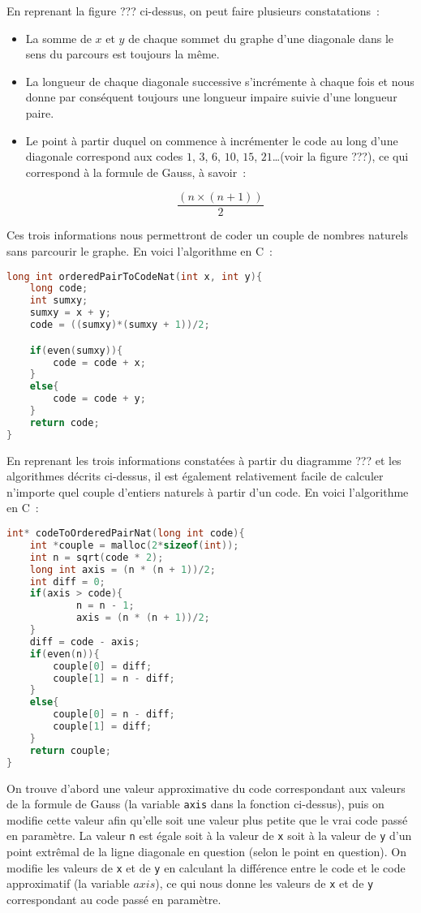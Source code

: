 \documentclass{article}
\begin{document}
En reprenant la figure ??? ci-dessus, on peut faire plusieurs constatations~:

\begin{itemize}
\item La somme de $x$ et $y$ de chaque sommet du graphe d'une diagonale dans le sens du parcours est toujours la même.
\item La longueur de chaque diagonale successive s'incrémente à chaque fois et nous donne par conséquent toujours une longueur impaire suivie d'une longueur paire.
\item Le point à partir duquel on commence à incrémenter le code au long d'une diagonale correspond aux codes $1$, $3$, $6$, $10$, $15$, $21$\ldots (voir la figure ???), ce qui correspond à la formule de Gauss, à savoir~:

$$\dfrac{(n \times (n + 1))}{2}$$
\end{itemize}

Ces trois informations nous permettront de coder un couple de nombres naturels sans parcourir le graphe. En voici l'algorithme en C~:

\begin{lstlisting}[language=C]
long int orderedPairToCodeNat(int x, int y){
	long code;
	int sumxy; 
	sumxy = x + y;
	code = ((sumxy)*(sumxy + 1))/2;

	if(even(sumxy)){
		code = code + x;
	}
	else{
		code = code + y; 
	}
	return code;
}
\end{lstlisting}


En reprenant les trois informations constatées à partir du diagramme ??? et les algorithmes décrits ci-dessus, il est également relativement facile de calculer n'importe quel couple d'entiers naturels à partir d'un code. En voici l'algorithme en C~:

\begin{lstlisting}[language=C]
int* codeToOrderedPairNat(long int code){
	int *couple = malloc(2*sizeof(int));
	int n = sqrt(code * 2);
	long int axis = (n * (n + 1))/2;
	int diff = 0;
	if(axis > code){
			n = n - 1;
			axis = (n * (n + 1))/2;
	}
	diff = code - axis;
	if(even(n)){
		couple[0] = diff;
		couple[1] = n - diff;
	}
	else{
		couple[0] = n - diff;
		couple[1] = diff;
	}
	return couple;
}
\end{lstlisting}

On trouve d'abord une valeur approximative du code correspondant aux valeurs de la formule de Gauss (la variable \lstinline!axis! dans la fonction ci-dessus), puis on modifie cette valeur afin qu'elle soit une valeur plus petite que le vrai code passé en paramètre. La valeur \lstinline!n! est égale soit à la valeur de \lstinline!x! soit à la valeur de \lstinline!y! d'un point extrêmal de la ligne diagonale en question (selon le point en question). On modifie les valeurs de \lstinline!x! et de \lstinline!y! en calculant la différence entre le code et le code approximatif (la variable $axis$), ce qui nous donne les valeurs de \lstinline!x! et de \lstinline!y! correspondant au code passé en paramètre.
\end{document}
